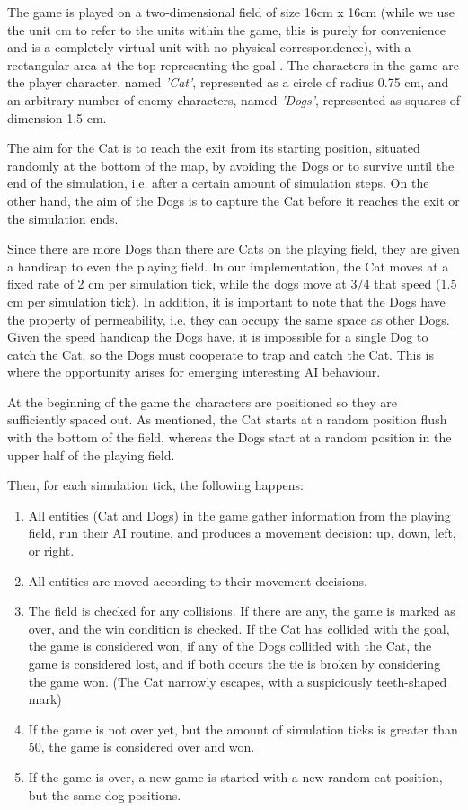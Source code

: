 The game is played on a two-dimensional field of size 16cm x 16cm (while we use
the unit cm to refer to the units within the game, this is purely for
convenience and is a completely virtual unit with no physical correspondence),
with a rectangular area at the top representing the goal . The characters in the game are the player character, named
\emph{'Cat'}, represented as a circle of radius 0.75 cm, and an arbitrary number
of enemy characters, named \emph{'Dogs'}, represented as squares of dimension
1.5 cm.

The aim for the Cat is to reach the exit from its starting position, situated
randomly at the bottom of the map, by avoiding the Dogs or to survive until the
end of the simulation, i.e. after a certain amount of simulation steps. On the
other hand, the aim of the Dogs is to capture the Cat before it reaches the exit
or the simulation ends.

Since there are more Dogs than there are Cats on the playing field, they are
given a handicap to even the playing field. In our implementation, the Cat moves
at a fixed rate of 2 cm per simulation tick, while the dogs move at $3/4$ that
speed (1.5 cm per simulation tick). In addition, it is important to note that
the Dogs have the property of permeability, i.e. they can occupy the same space
as other Dogs. Given the speed handicap the Dogs have, it is impossible for a
single Dog to catch the Cat, so the Dogs must cooperate to trap and catch the
Cat. This is where the opportunity arises for emerging interesting AI behaviour.

At the beginning of the game the characters are positioned so they are
sufficiently spaced out. As mentioned, the Cat starts at a random position flush
with the bottom of the field, whereas the Dogs start at a random position in the
upper half of the playing field.

Then, for each simulation tick, the following happens:

\begin{enumerate}
\item All entities (Cat and Dogs) in the game gather information from the
  playing field, run their AI routine, and produces a movement decision: up,
  down, left, or right.
\item All entities are moved according to their movement decisions.
\item The field is checked for any collisions. If there are any, the game is
  marked as over, and the win condition is checked. If the Cat has collided with
  the goal, the game is considered won, if any of the Dogs collided with the
  Cat, the game is considered lost, and if both occurs the tie is broken by
  considering the game won. (The Cat narrowly escapes, with a suspiciously
  teeth-shaped mark)
\item If the game is not over yet, but the amount of simulation ticks is greater
  than 50, the game is considered over and won.
\item If the game is over, a new game is started with a new random cat position,
  but the same dog positions. 
\end{enumerate}

